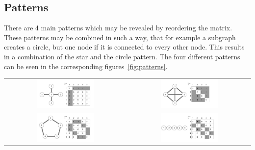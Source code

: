 \subsection{Patterns}
There are 4 main patterns which may be revealed by reordering the matrix. These patterns may be combined in such a way, that for example a subgraph creates a circle, but one node if it is connected to every other node. This results in a combination of the star and the circle pattern. 
The four different patterns can be seen in the corresponding figures~\ref{fig:patterns}.
\begin{table}
  \centering
\begin{tabu}{cc}
	\includegraphics[width=0.49\textwidth]{images/pattern_star}  &
	\includegraphics[width=0.49\textwidth]{images/pattern_full} \\
	\includegraphics[width=0.49\textwidth]{images/pattern_circle} &
	\includegraphics[width=0.49\textwidth]{images/pattern_line} 
\end{tabu}
\end{table}

